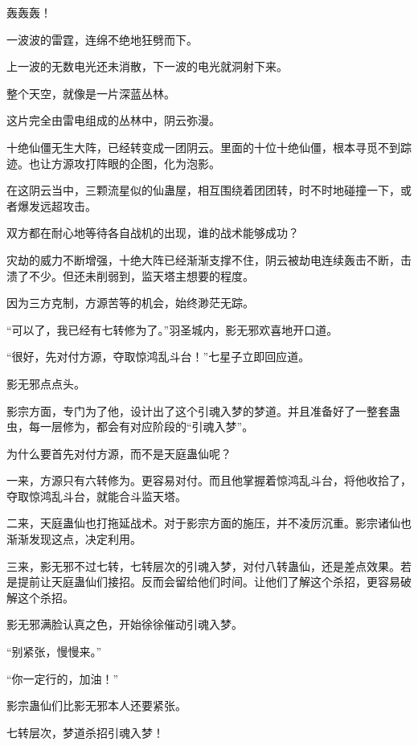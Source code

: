 
\begin{this_body}

轰轰轰！

一波波的雷霆，连绵不绝地狂劈而下。

上一波的无数电光还未消散，下一波的电光就洞射下来。

整个天空，就像是一片深蓝丛林。

这片完全由雷电组成的丛林中，阴云弥漫。

十绝仙僵无生大阵，已经转变成一团阴云。里面的十位十绝仙僵，根本寻觅不到踪迹。也让方源攻打阵眼的企图，化为泡影。

在这阴云当中，三颗流星似的仙蛊屋，相互围绕着团团转，时不时地碰撞一下，或者爆发远超攻击。

双方都在耐心地等待各自战机的出现，谁的战术能够成功？

灾劫的威力不断增强，十绝大阵已经渐渐支撑不住，阴云被劫电连续轰击不断，击溃了不少。但还未削弱到，监天塔主想要的程度。

因为三方克制，方源苦等的机会，始终渺茫无踪。

“可以了，我已经有七转修为了。”羽圣城内，影无邪欢喜地开口道。

“很好，先对付方源，夺取惊鸿乱斗台！”七星子立即回应道。

影无邪点点头。

影宗方面，专门为了他，设计出了这个引魂入梦的梦道。并且准备好了一整套蛊虫，每一层修为，都会有对应阶段的“引魂入梦”。

为什么要首先对付方源，而不是天庭蛊仙呢？

一来，方源只有六转修为。更容易对付。而且他掌握着惊鸿乱斗台，将他收拾了，夺取惊鸿乱斗台，就能合斗监天塔。

二来，天庭蛊仙也打拖延战术。对于影宗方面的施压，并不凌厉沉重。影宗诸仙也渐渐发现这点，决定利用。

三来，影无邪不过七转，七转层次的引魂入梦，对付八转蛊仙，还是差点效果。若是提前让天庭蛊仙们接招。反而会留给他们时间。让他们了解这个杀招，更容易破解这个杀招。

影无邪满脸认真之色，开始徐徐催动引魂入梦。

“别紧张，慢慢来。”

“你一定行的，加油！”

影宗蛊仙们比影无邪本人还要紧张。

七转层次，梦道杀招引魂入梦！


\end{this_body}
